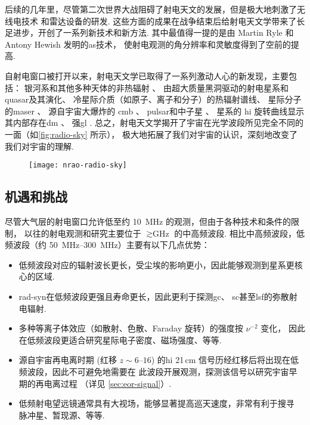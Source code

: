 后续的几年里，尽管第二次世界大战阻碍了射电天文的发展，但是极大地刺激了无线电技术
和雷达设备的研发.
这些方面的成果在战争结束后给射电天文学带来了长足进步，开创了一系列新技术和新方法.
其中最值得一提的是由 Martin Ryle 和 Antony Hewish 发明的\ac{as}技术，
使射电观测的角分辨率和灵敏度得到了空前的提高.

自射电窗口被打开以来，射电天文学已取得了一系列激动人心的新发现，主要包括：
银河系和其他多种天体的非热辐射 \cite{reber1940}、
由超大质量黑洞驱动的射电星系\cite{baade1954}和\ac{quasar}\cite{hazard1963,schmidt1963}及其演化、
冷星际介质（如原子、离子和分子）的热辐射谱线、
星际分子的\ac{maser} \cite{weaver1965}、
源自宇宙大爆炸的 \ac{cmb} \cite{penzias1965}、
\ac{pulsar}和中子星 \cite{hewish1968}、
星系的 \ac{hi} 旋转曲线显示其内部存在\ac{dm} \cite{roberts1975}、
强\ac{gl} \cite{walsh1979}.
总之，射电天文学揭开了宇宙在光学波段所见完全不同的一面（如\autoref{fig:radio-sky} 所示），
极大地拓展了我们对宇宙的认识，深刻地改变了我们对宇宙的理解.

\begin{figure}[htp]
  \centering
  \texttt{[image: nrao-radio-sky]}
  \label{fig:radio-sky}
\end{figure}

\subsection{机遇和挑战}

尽管大气层的射电窗口允许低至约 \SI{10}{\MHz} 的观测，但由于各种技术和条件的限制，
以往的射电观测和研究主要位于 $\gtrsim \si{\GHz}$ 的中高频波段.
相比中高频波段，低频波段（约 \SIrange{50}{300}{\MHz}）主要有以下几点优势：
\begin{itemize}
  \item 低频波段对应的辐射波长更长，受尘埃的影响更小，因此能够观测到星系更核心的区域.
  \item \ac{rad-syn}在低频波段更强且寿命更长，因此更利于探测\ac{gc}、
    \ac{sc}甚至\ac{lsf}的弥散射电辐射.
  \item 多种等离子体效应（如散射、色散、Faraday 旋转）的强度按 $\nu^{-2}$ 变化，
    因此在低频波段更适合研究星际电子密度、磁场强度、等等.
  \item 源自宇宙再电离时期 (红移 $z \sim \numrange{6}{16}$)
    的\ac{hi} 21\,cm 信号历经红移后将出现在低频波段，因此不可避免地需要在
    此波段开展观测，探测该信号以研究宇宙早期的再电离过程
    （详见 \autoref{sec:eor-signal}）.
  \item 低频射电望远镜通常具有大视场，能够显著提高巡天速度，非常有利于搜寻
    脉冲星、暂现源、等等.
\end{itemize}

